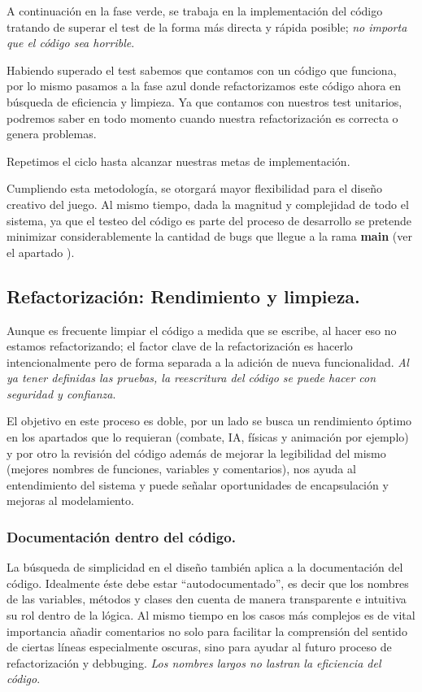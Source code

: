 A continuación en la fase verde, se trabaja en la implementación del código tratando de superar el test de la forma más directa y rápida posible; \textit{no importa que el código sea horrible}.

Habiendo superado el test sabemos que contamos con un código que funciona, por lo mismo pasamos a la fase azul donde refactorizamos este código ahora en búsqueda de eficiencia y limpieza. Ya que contamos con nuestros test unitarios, podremos saber en todo momento cuando nuestra refactorización es correcta o genera problemas.

Repetimos el ciclo hasta alcanzar nuestras metas de implementación.

Cumpliendo esta metodología, se otorgará mayor flexibilidad para el diseño creativo del juego. Al mismo tiempo, dada la magnitud y complejidad de todo el sistema, ya que el testeo del código es parte del proceso de desarrollo se pretende minimizar considerablemente la cantidad de bugs que llegue a la rama \textbf{main} (ver el apartado ).

\subsection{Refactorización: Rendimiento y limpieza.}\label{principios:refactorizacion-rendimiento-limpieza}
Aunque es frecuente limpiar el código a medida que se escribe, al hacer eso no estamos refactorizando; el factor clave de la refactorización es hacerlo intencionalmente pero de forma separada a la adición de nueva funcionalidad. \emph{Al ya tener definidas las pruebas, la reescritura del código se puede hacer con seguridad y confianza}.

El objetivo en este proceso es doble, por un lado se busca un rendimiento óptimo en los apartados que lo requieran (combate, IA, físicas y animación por ejemplo) y por otro la revisión del código además de mejorar la legibilidad del mismo (mejores nombres de funciones, variables y comentarios), nos ayuda al entendimiento del sistema y puede señalar oportunidades de encapsulación y mejoras al modelamiento.

\subsubsection{Documentación dentro del código.}\label{principios:documentacion-en-codigo}
La búsqueda de simplicidad en el diseño también aplica a la documentación del código. Idealmente éste debe estar “autodocumentado”, es decir que los nombres de las variables, métodos y clases den cuenta de manera transparente e intuitiva su rol dentro de la lógica. Al mismo tiempo en los casos más complejos es de vital importancia añadir comentarios no solo para facilitar la comprensión del sentido de ciertas líneas especialmente oscuras, sino para ayudar al futuro proceso de refactorización y debbuging. \emph{Los nombres largos no lastran la eficiencia del código}.

